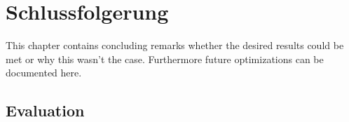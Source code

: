 \chapter{Schlussfolgerung}
\label{chap:schlussfolgerung}

This chapter contains concluding remarks whether the desired results could be met or why this wasn't the case.
Furthermore future optimizations can be documented here.

\section{Evaluation}
\label{sec:conclusion_evaluation}

